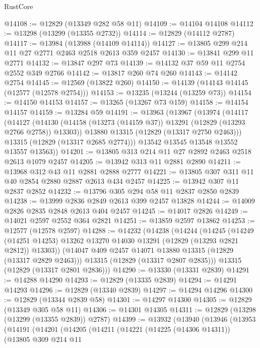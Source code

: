\begin{lexlean}{RustCore}
\begin{coremodule}
@14108 := @12829 (@13349 @282 @58 @11)
@14109 := @14104 @14108
@14112 := @13298 (@13299 (@13355 @2732))
@14114 := @12829 (@14112 @2787)
@14117 := @13984 (@13988 (@14109 @14114))
@14127 := @13805 @299 @214 @11 @27 @2771 @2463 @2518 @2613 @359 @2457
@14130 := @13841 @299 @11 @2771
@14132 := @13847 @297 @73
@14139 := @14132 @37 @59 @11 @2754 @2552 @349 @2766
@14142 := @13817 @260 @74 @260
@14143 := @14142 @2754
@14145 := @12569 (@13822 @260)
@14150 := @14139 (@14143 @14145 (@12577 (@12578 @2754)))
@14153 := @13235 (@13244 (@13259 @73))
@14154 := @14150 @14153
@14157 := @13265 (@13267 @73 @159)
@14158 := @14154 @14157
@14159 := @13284 @59
@14191 := @13963
    (@13967
      (@13974
        (@14117
          (@14127
            (@14130 (@14158 (@13273 (@14159 @37)) @13291 (@12829 (@13293 @2766 @2758)) @13303))
            @13880
            @13315
            (@12829 (@13317 @2750 @2463)))
          @13315
          (@12829 (@13317 @2685 @2774)))
        @13542
        @13545
        @13548
        @13552
        @13557
        @13563))
@14201 := @13805 @313 @214 @11 @27 @2892 @2463 @2518 @2613 @1079 @2457
@14205 := @13942 @313 @11 @2881 @2890
@14211 := @13968 @312 @43 @11 @2881 @2888 @2777
@14221 := @13805 @307 @311 @11 @40 @2854 @2880 @2887 @2613 @434 @2457
@14225 := @13942 @307 @11 @2837 @2852
@14232 := @13796 @305 @294 @58 @11 @2837 @2850 @2839
@14238 := @13999 @2836 @2849 @2613 @399 @2457 @13828
@14244 := @14009 @2826 @2835 @2848 @2613 @404 @2457
@14245 := @14017 @2826
@14249 := @14021 @2597 @2552 @364 @2821
@14251 := @13859 @2597 @13862
@14253 := @12577 (@12578 @2597)
@14288 := @14232
    (@14238
      (@14244
        (@14245
          (@14249 (@14251 @14253) @13262 @13270 @14030 @13291 (@12829 (@13293 @2821 @2812)) @13303))
        (@14047 @409 @2457 @14071 @13880 @13315 (@12829 (@13317 @2829 @2463)))
        @13315
        (@12829 (@13317 @2807 @2835)))
      @13315
      (@12829 (@13317 @2801 @2836)))
@14290 := @13330 (@13331 @2839)
@14291 := @14288 @14290
@14293 := @12829 (@13335 @2839)
@14294 := @14291 @14293
@14296 := @12829 (@13340 @2839)
@14297 := @14294 @14296
@14300 := @12829 (@13344 @2839 @58)
@14301 := @14297 @14300
@14305 := @12829 (@13349 @305 @58 @11)
@14306 := @14301 @14305
@14311 := @12829 (@13298 (@13299 (@13355 @2839)) @2787)
@14399 := @13932
    (@13940
      (@13946
        (@13953
          (@14191
            (@14201
              (@14205
                (@14211
                  (@14221
                    (@14225 (@14306 @14311))
                    (@13805
                      @309
                      @214
                      @11

\end{coremodule}
\end{lexlean}
